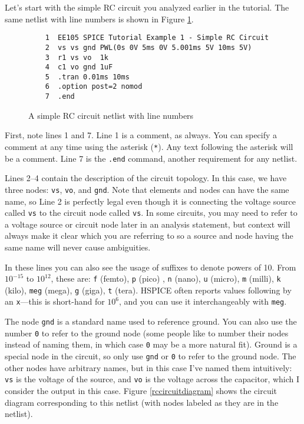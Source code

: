 \documentclass{article}
\begin{document}
Let's start with the simple RC circuit you analyzed earlier in the tutorial. The same netlist with line numbers is shown in Figure \ref{rccircuit2}.

\begin{figure}[!htb]
  \begin{verbatim}
    1  EE105 SPICE Tutorial Example 1 - Simple RC Circuit
    2  vs vs gnd PWL(0s 0V 5ms 0V 5.001ms 5V 10ms 5V)
    3  r1 vs vo  1k
    4  c1 vo gnd 1uF
    5  .tran 0.01ms 10ms
    6  .option post=2 nomod
    7  .end \end{verbatim}
  \caption{A simple RC circuit netlist with line numbers}
  \label{rccircuit2}
\end{figure}

First, note lines 1 and 7. Line 1 is a comment, as always. You can specify a comment at any time using the asterisk (\verb|*|). Any text following the asterisk will be a comment. Line 7 is the \verb|.end| command, another requirement for any netlist.

Lines 2--4 contain the description of the circuit topology. In this case, we have three nodes: \verb|vs|, \verb|vo|, and \verb|gnd|. Note that elements and nodes can have the same name, so Line 2 is perfectly legal even though it is connecting the voltage source called \verb|vs| to the circuit node called \verb|vs|. In some circuits, you may need to refer to a voltage source or circuit node later in an analysis statement, but context will always make it clear which you are referring to so a source and node having the same name will never cause ambiguities.

In these lines you can also see the usage of suffixes to denote powers of 10. From $10^{-15}$ to $10^{12}$, these are: \verb|f| (femto), \verb|p| (pico) , \verb|n| (nano), \verb|u| (micro), \verb|m| (milli), \verb|k| (kilo), \verb|meg| (mega), \verb|g| (giga), \verb|t| (tera). HSPICE often reports values following by an \verb|x|---this is short-hand for $10^6$, and you can use it interchangeably with \verb|meg|.

The node \verb|gnd| is a standard name used to reference ground. You can also use the number \verb|0| to refer to the ground node (some people like to number their nodes instead of naming them, in which case \verb|0| may be a more natural fit). Ground is a special node in the circuit, so only use \verb|gnd| or \verb|0| to refer to the ground node. The other nodes have arbitrary names, but in this case I've named them intuitively: \verb|vs| is the voltage of the source, and \verb|vo| is the voltage across the capacitor, which I consider the output in this case. Figure \ref{rccircuitdiagram} shows the circuit diagram corresponding to this netlist (with nodes labeled as they are in the netlist).
\end{document}
